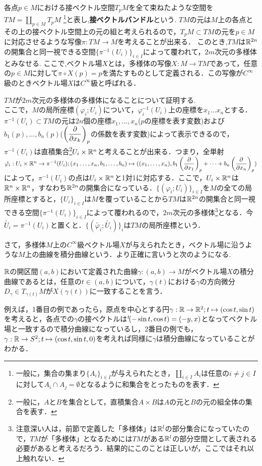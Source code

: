 \begin{s_defi}
各点$p\in M$における接ベクトル空間$T_pM$を全て束ねたような空間を$TM=\coprod_{p\in M}T_pM$
\footnote{一般に，集合の集まり$\{A_i\}_{i\in I}$が与えられたとき，$\coprod_{i\in I}A_i$は任意の$i\neq j\in I$に対して$A_i\cap A_j=\emptyset$となるように和集合をとったものを表す．}と表し,\textbf{接ベクトルバンドル}という.
$TM$の元は$M$上の各点とその上の接ベクトル空間上の元の組と考えられるので，$T_pM\subset TM$の元を$p\in M$に対応させるような写像$\pi:TM\rightarrow M$を考えることが出来る．
このとき,$TM$は${\mathbb R}^{2n}$の開集合と同一視できる空間$\{\pi^{-1}(U_i)\}_{i\in I}$によって覆われて，$2m$次元の多様体とみなせる.
ここで,ベクトル場$X$とは，多様体の写像$X:M\rightarrow TM$であって，任意の$p\in M$に対して$\pi\circ X(p) = p$を満たすものとして定義される．この写像が$C^{\infty}$級のときベクトル場$X$は$C^{\infty}$級と呼ばれる．
\end{s_defi}
\begin{Proof}
$TM$が$2m$次元の多様体の多様体になることについて証明する.\\
ここで，$M$の局所座標$(\varphi_i;U_i)$について，$\varphi_i^{-1}(U_i)$上の座標を$x_1\dots x_n$とする．$\pi^{-1}(U_i)\subset TM$の元は$2n$個の座標$x_1,\dots,x_n$($p$の座標を表す変数)および$b_1(p),\dots,b_n(p)$($\left(\displaystyle\frac{\partial}{\partial x_k}\right)_p$の係数を表す変数)によって表示できるので，$\pi^{-1}(U_i)$は直積集合\footnote{一般に，$A$と$B$を集合として，直積集合$A\times B$は$A$の元と$B$の元の組全体の集合を表す．}$U_i\times {\mathbb R}^n$と考えることが出来る．つまり，全単射$\tilde{\varphi_i}:U_i\times {\mathbb R}^n\rightarrow\pi^{-1}(U_i);(x_1\dots,x_n,b_1,\dots,b_n)\mapsto ((x_1,\dots,x_n),b_1\left(\displaystyle\frac{\partial}{\partial x_1}\right)_p+\dots+b_n\left(\displaystyle\frac{\partial}{\partial x_n}\right)_p)$によって，$\pi^{-1}(U_i)$の点は$U_i\times{\mathbb R}^n$と1対1に対応する．ここで，$U_i\times {\mathbb R}^n$は${\mathbb R}^n\times {\mathbb R}^n$，すなわち${\mathbb R}^{2n}$の開集合になっている．$\{(\varphi_i;U_i)\}_{i\in I}$を$M$の全ての局所座標とすると，$\{U_i\}_{i\in I}$は$M$を覆っていることから$TM$は${\mathbb R}^{2n}$の開集合と同一視できる空間$\{\pi^{-1}(U_i)\}_{i\in I}$によって覆われるので，$2m$次元の多様体\footnote{注意深い人は，前節で定義した「多様体」は${\mathbb R}^l$の部分集合になっていたので，$TM$が「多様体」となるためには$TM$がある${\mathbb R}^l$の部分空間として表される必要があると考えるだろう．結果的にこのことは正しいが，ここではそれ以上触れない．}となる．今$\tilde{U_i}=\pi^{-1}(U_i)$と置くと．$\{(\tilde{\varphi_i};\tilde{U_i})\}_i$は$TM$の局所座標という．
\end{Proof}
さて，多様体$M$上の$C^\infty$級ベクトル場$X$が与えられたとき，ベクトル場に沿うような$M$上の曲線を積分曲線という．より正確に言いうと次のようになる.
\begin{s_defi}
${\mathbb R}$の開区間$(a,b)$において定義された曲線$\gamma:(a,b)\rightarrow M$がベクトル場$X$の積分曲線であるとは，任意の$t\in(a,b)$について，$\gamma(t)$における$\gamma$の方向微分$D_\gamma\in T_{\gamma(t)}M$が$X(\gamma(t))$に一致することを言う．
\end{s_defi}
例えば，1番目の例であったら，原点を中心とする円$\gamma:{\mathbb R}\rightarrow {\mathbb R}^2;t\mapsto (\cos t,\sin t)$を考えると，各点での$\gamma$の接ベクトルは${}^t\!(-\sin t,\cos t)=(-y,x)$となってベクトル場と一致するので積分曲線になっているし，2番目の例でも，$\gamma:{\mathbb R}\rightarrow S^2;t\mapsto (\cos t,\sin t,0)$を考えれば同様に$\gamma$は積分曲線になっていることがわかる．

